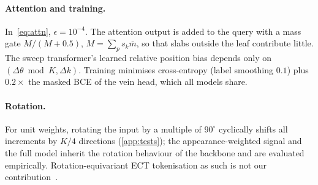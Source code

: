 \paragraph{Attention and training.} In~\eqref{eq:attn}, $\epsilon=10^{-4}$. The attention output is
added to the query with a mass gate $M/(M+0.5)$, $M=\sum_p s_k\bar m$, so that slabs outside the leaf
contribute little. The sweep transformer's learned relative position bias depends only on
$(\Delta\theta \bmod K,\Delta k)$. Training minimises cross-entropy (label smoothing $0.1$) plus
$0.2\times$ the masked BCE of the vein head, which all models share.

\paragraph{Rotation.} For unit weights, rotating the input by a multiple of $90^\circ$ cyclically
shifts all increments by $K/4$ directions (\cref{app:tests}); the appearance-weighted signal and the
full model inherit the rotation behaviour of the backbone and are evaluated empirically.
Rotation-equivariant ECT tokenisation as such is not our contribution~\citep{blaser2026encoding}.
